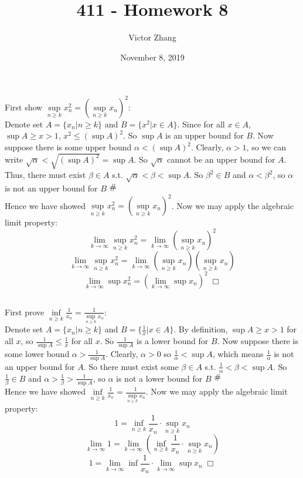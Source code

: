 \documentclass{article}
\title{411 - Homework 8}
\author{Victor Zhang }
\date{November 8, 2019}
\newcommand{\contra}{\raisebox{\depth}{\#}}
\begin{document}
\maketitle

\section{}
\subsection{}
First show $\sup\limits_{n\geq k} x_n^2 = (\sup\limits_{n\geq k} x_n)^2$:\\
Denote set $A = \{x_n | n\geq k\}$ and $B = \{x^2 | x\in A\}$. Since for all $x \in A$, $\sup A \geq x>1$, $x^2\leq (\sup A)^2$. So $\sup A$ is an upper bound for $B$. Now suppose there is some upper bound $\alpha < (\sup A)^2$. Clearly, $\alpha > 1$, so we can write $\sqrt{\alpha} < \sqrt{(\sup A)^2} = \sup A$. So $\sqrt{\alpha}$ cannot be an upper bound for $A$. Thus, there must exist $\beta \in A$ s.t. $\sqrt{\alpha} < \beta < \sup A$. So $\beta^2 \in B$ and $\alpha < \beta ^2$, so $\alpha$ is not an upper bound for $B$ $\contra$\\
Hence we have showed $\sup\limits_{n\geq k} x_n^2 = (\sup\limits_{n\geq k} x_n)^2$. Now we may apply the algebraic limit property:\\
$$\lim\limits_{k \rightarrow \infty}\sup\limits_{n \geq k} x_n^2 = \lim\limits_{k \rightarrow \infty}(\sup\limits_{n \geq k} x_n)^2$$
$$\lim\limits_{k \rightarrow \infty}\sup\limits_{n \geq k} x_n^2 = \lim\limits_{k \rightarrow \infty}(\sup\limits_{n \geq k} x_n)(\sup\limits_{n \geq k} x_n)$$
$$\lim\limits_{k \rightarrow \infty}\sup x_n^2 = (\lim\limits_{k \rightarrow \infty}\sup x_n)^2 \; \Box$$

\subsection{}
First prove $\inf\limits_{n\geq k} \frac{1}{x_n} = \frac{1}{\sup\limits_{n\geq k} x_n}$:\\
Denote set $A = \{x_n | n\geq k\}$ and $B = \{\frac{1}{x} | x\in A\}$. By definition, $\sup A \geq x>1$ for all $x$, so $\frac{1}{\sup A} \leq \frac{1}{x}$ for all $x$. So $\frac{1}{\sup A}$ is a lower bound for $B$. Now suppose there is some lower bound $\alpha > \frac{1}{\sup A}$. Clearly, $\alpha > 0$ so $\frac{1}{\alpha} < \sup A$, which means $\frac{1}{\alpha}$ is not an upper bound for $A$. So there must exist some $\beta \in A$ s.t. $\frac{1}{\alpha} < \beta < \sup A$. So $\frac{1}{\beta} \in B$ and $\alpha > \frac{1}{\beta} > \frac{1}{\sup A}$, so $\alpha$ is not a lower bound for $B$ $\contra$\\
Hence we have showed $\inf\limits_{n\geq k} \frac{1}{x_n} = \frac{1}{\sup\limits_{n\geq k} x_n}$. Now we may apply the algebraic limit property:\\
$$1 = \inf\limits_{n \geq k} \frac{1}{x_n} \cdot \sup\limits_{n\geq k} x_n$$
$$\lim\limits_{k \rightarrow \infty} 1 = \lim\limits_{k \rightarrow \infty}(\inf\limits_{n \geq k} \frac{1}{x_n} \cdot \sup\limits_{n\geq k} x_n)$$
$$1 = \lim\limits_{k\rightarrow \infty}\inf \frac{1}{x_n}\cdot \lim\limits_{k\rightarrow \infty}\sup x_n \; \Box$$
\end{document}

